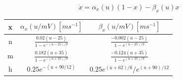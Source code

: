     \begin{dmath}
        \dot{\mathit{x}} = \alpha_x(u) (1-x) - \beta_x(u) x 
        \label{eq:gating-variables}
    \end{dmath}

    \begin{center}
        \label{tab:parameters}
        \begin{tabular}{@{}ccc@{}}
        \toprule
        x & $\alpha_x (u/mV) [ms^{-1}]$ & $\beta_x (u/mV) [ms^{-1}]$ \\
        \midrule
        n & $\frac{0.02(u-25)}{1-e^{-(u-25)/9}}$ & $\frac{-0.002(u-25)}{1-e^{(u-25)/9}}$ \\
        m & $\frac{0.182(u+35)}{1-e^{-(u+35)/9}}$ & $\frac{-0.124(u+35)}{1-e^{(u+35)/9}}$ \\
        h & $0.25e^{-(u+90/12)}$ & $0.25e^{(u+62)/6}/e^{(u+90)/12}$ \\
        \bottomrule
        \end{tabular}
    \end{center}
